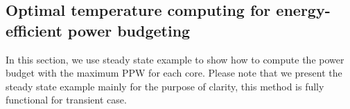 

\subsection{Optimal temperature computing for energy-efficient power budgeting}
In this section, we use steady state example to show how to compute
the power budget with the maximum PPW for each core. Please note that
we present the steady state example mainly for the purpose of clarity,
this method is fully functional for transient case. 



